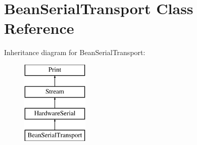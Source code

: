 \hypertarget{class_bean_serial_transport}{}\section{Bean\+Serial\+Transport Class Reference}
\label{class_bean_serial_transport}
Inheritance diagram for Bean\+Serial\+Transport\+:\begin{figure}[H]
\begin{center}
\leavevmode
\includegraphics[height=4.000000cm]{class_bean_serial_transport}
\end{center}
\end{figure}
